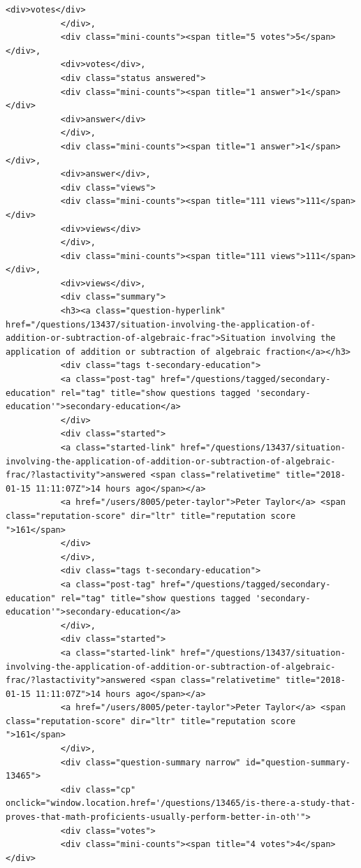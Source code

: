 \documentclass[11pt]{article}
\begin{document}
\begin{Verbatim}[commandchars=\\\{\}]
           <div>votes</div>
           </div>,
           <div class="mini-counts"><span title="5 votes">5</span></div>,
           <div>votes</div>,
           <div class="status answered">
           <div class="mini-counts"><span title="1 answer">1</span></div>
           <div>answer</div>
           </div>,
           <div class="mini-counts"><span title="1 answer">1</span></div>,
           <div>answer</div>,
           <div class="views">
           <div class="mini-counts"><span title="111 views">111</span></div>
           <div>views</div>
           </div>,
           <div class="mini-counts"><span title="111 views">111</span></div>,
           <div>views</div>,
           <div class="summary">
           <h3><a class="question-hyperlink" href="/questions/13437/situation-involving-the-application-of-addition-or-subtraction-of-algebraic-frac">Situation involving the application of addition or subtraction of algebraic fraction</a></h3>
           <div class="tags t-secondary-education">
           <a class="post-tag" href="/questions/tagged/secondary-education" rel="tag" title="show questions tagged 'secondary-education'">secondary-education</a>
           </div>
           <div class="started">
           <a class="started-link" href="/questions/13437/situation-involving-the-application-of-addition-or-subtraction-of-algebraic-frac/?lastactivity">answered <span class="relativetime" title="2018-01-15 11:11:07Z">14 hours ago</span></a>
           <a href="/users/8005/peter-taylor">Peter Taylor</a> <span class="reputation-score" dir="ltr" title="reputation score ">161</span>
           </div>
           </div>,
           <div class="tags t-secondary-education">
           <a class="post-tag" href="/questions/tagged/secondary-education" rel="tag" title="show questions tagged 'secondary-education'">secondary-education</a>
           </div>,
           <div class="started">
           <a class="started-link" href="/questions/13437/situation-involving-the-application-of-addition-or-subtraction-of-algebraic-frac/?lastactivity">answered <span class="relativetime" title="2018-01-15 11:11:07Z">14 hours ago</span></a>
           <a href="/users/8005/peter-taylor">Peter Taylor</a> <span class="reputation-score" dir="ltr" title="reputation score ">161</span>
           </div>,
           <div class="question-summary narrow" id="question-summary-13465">
           <div class="cp" onclick="window.location.href='/questions/13465/is-there-a-study-that-proves-that-math-proficients-usually-perform-better-in-oth'">
           <div class="votes">
           <div class="mini-counts"><span title="4 votes">4</span></div>

\end{Verbatim}
\end{document}
